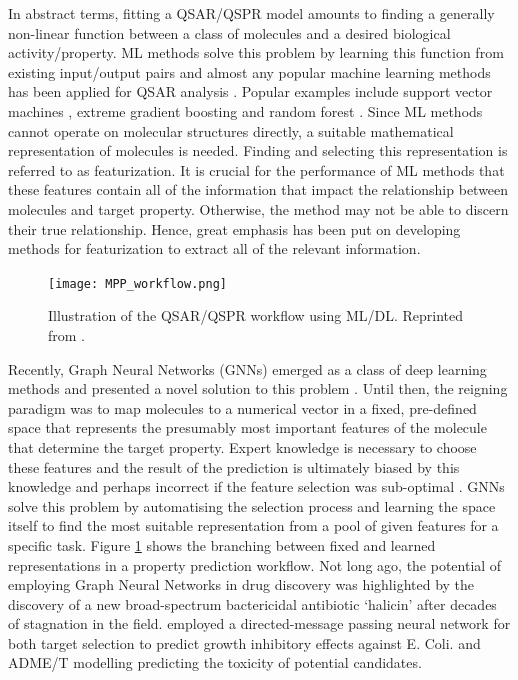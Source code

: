 In abstract terms, fitting a QSAR/QSPR model amounts to finding a generally non-linear function between a class of molecules and a desired biological activity/property. ML methods solve this problem by learning this function from existing input/output pairs and almost any popular machine learning methods has been applied for QSAR analysis \cite{SHEN201929}. Popular examples include support vector machines \cite{supv1, supv2}, extreme gradient boosting \cite{XG1, XG2} and random forest \cite{RF1}. Since ML methods cannot operate on molecular structures directly, a suitable mathematical representation of molecules is needed. Finding and selecting this representation is referred to as featurization. It is crucial for the performance of ML methods that these features contain all of the information that impact the relationship between molecules and target property. Otherwise, the method may not be able to discern their true relationship. Hence, great emphasis has been put on developing methods for featurization to extract all of the relevant information.

\begin{figure}[h]
	\centering 
	\texttt{[image: MPP\_workflow.png]}
	\caption{Illustration of the QSAR/QSPR workflow using ML/DL. Reprinted from \cite{yangMPP}. }
	\label{fig:mpp_workflow}
\end{figure}
Recently, Graph Neural Networks (GNNs) emerged as a class of deep learning methods and presented a novel solution to this problem \citep{duvenaud2015convolutional, li2019deepchemstable, STOKES2020688}. Until then, the reigning paradigm was to map molecules to a numerical vector in a fixed, pre-defined space that represents the presumably most important features of the molecule that determine the target property. Expert knowledge is necessary to choose these features and the result of the prediction is ultimately biased by this knowledge and perhaps incorrect if the feature selection was sub-optimal \citep{WIEDER2020}. GNNs solve this problem by automatising the selection process and learning the space itself to find the most suitable representation from a pool of given features for a specific task. Figure \ref{fig:mpp_workflow} shows the branching between fixed and learned representations in a property prediction workflow. Not long ago, the potential of employing Graph Neural Networks in drug discovery was highlighted by the discovery of a new broad-spectrum bactericidal antibiotic `halicin' after decades of stagnation in the field. \cite{STOKES2020688} employed a directed-message passing neural network \cite{yangMPP} for both target selection to predict growth inhibitory effects against E. Coli. and ADME/T modelling predicting the toxicity of potential candidates.%

